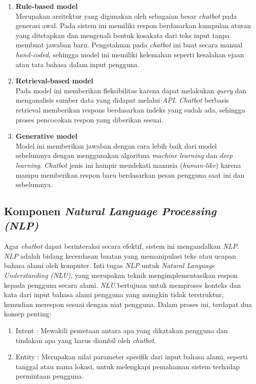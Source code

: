 \begin{enumerate}
  \item \textbf{Rule-based model} \\
    Merupakan arsitektur yang digunakan oleh sebagaian besar \textit{chatbot} pada generasi awal. Pada sistem ini memiliki respon berdasarkan kumpulan aturan yang ditetapkan dan mengenali bentuk kosakata dari teks input tanpa membuat jawaban baru.
    Pengetahuan pada \textit{chatbot} ini buat secara manual \textit{hand-coded}, sehingga model ini memiliki kelemahan seperti kesalahan ejaan atau tata bahasa dalam input pengguna.
  
  \item \textbf{Retrieval-based model} \\
    Pada model ini memberikan fleksibilitas karena dapat melakukan \textit{query} dan menganalisis sumber data yang didapat melalui \textit{API}. \textit{Chatbot} berbasis retrieval memberikan respons berdasarkan indeks yang sudah ada,
    sehingga proses pencocokan respon yang diberikan sesuai.
  
  \item \textbf{Generative model} \\
    Model ini memberikan jawaban dengan cara lebih baik dari model sebelumnya dengan menggunakan algoritma \textit{machine learning} dan \textit{deep learning}. \textit{Chatbot} jenis ini hampir mendekati manusia (\textit{human-like}) karena mampu memberikan respon
    baru berdasarkan pesan pengguna saat ini dan sebelumnya.

\end{enumerate}

\subsection{Komponen \textit{Natural Language Processing (NLP)}}
Agar \textit{chatbot} dapat berinteraksi secara efektif, sistem ini mengandalkan \textit{NLP}. \textit{NLP} adalah bidang kecerdasan buatan yang memanipulasi teks atau ucapan bahasa alami oleh komputer. Inti tugas \textit{NLP} untuk \textit{Natural Language Understanding (NLU)}, yang merupakan teknik mengimplementasikan respon kepada pengguna secara alami.
\textit{NLU} bertujuan untuk memproses konteks dan kata dari input bahasa alami pengguna yang mungkin tidak terstruktur, kemudian merespon sesuai dengan niat pengguna. Dalam proses ini, terdapat dua konsep penting:

\begin{enumerate}
  \renewcommand{\labelenumi}{\Roman{enumi}.}
    \item Intent : Mewakili pemetaan antara apa yang dikatakan pengguna dan tindakan apa yang harus diambil oleh \textit{chatbot}.
    
    \item Entity : Merupakan nilai parameter spesifik dari input bahasa alami, seperti tanggal atau nama lokasi, untuk melengkapi pemahaman sistem terhadap permintaan pengguna.
    
\end{enumerate}

